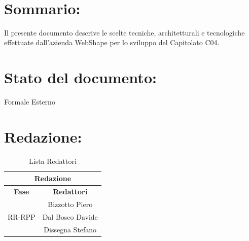 \newpage

\begin{center} %
	\begin{Huge}	
				\textbf{\TITOLODOC}
			\\
	\end{Huge}
\end{center}

\section*{\LARGE Sommario:}
Il presente documento descrive le scelte tecniche, architetturali e tecnologiche effettuate dall'azienda WebShape per lo sviluppo del Capitolato C04.

\indent \indent

\section*{\LARGE Stato del documento:}
\indent \indent
	Formale Esterno

\section*{\LARGE Redazione:}
	\begin{table}[!h]
		\begin{center}
			\begin{tabular}
				{|c|c|}
				\hline
				\multicolumn{2}{|c|}{ \textbf{Redazione} } \\
				\hline
				\textbf{Fase} & \textbf{Redattori} \\
				\hline
				\multirow{3}{*}{RR-RPP} & Bizzotto Piero\\
										& Dal Bosco Davide\\
										& Dissegna Stefano\\
				\hline
			\end{tabular}
			\caption{Lista Redattori} %
			\label{tabredazione}
		\end{center}
	\end{table}
	

